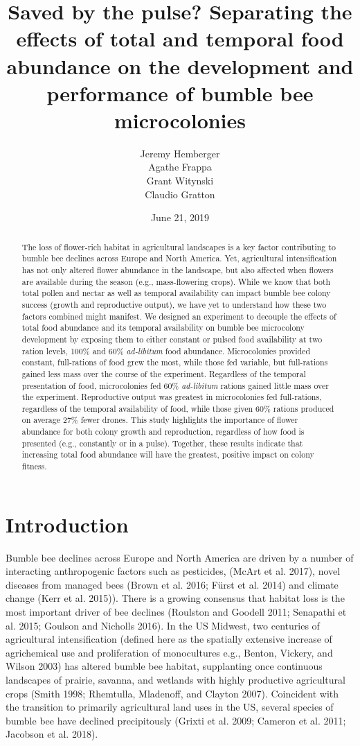 \documentclass[11pt,]{article}
\title{Saved by the pulse? Separating the effects of total and temporal food
abundance on the development and performance of bumble bee microcolonies}
\author{Jeremy Hemberger \\ Agathe Frappa \\ Grant Witynski \\ Claudio Gratton}
\date{June 21, 2019}
\begin{document}
\maketitle
\begin{abstract}
The loss of flower-rich habitat in agricultural landscapes is a key
factor contributing to bumble bee declines across Europe and North
America. Yet, agricultural intensification has not only altered flower
abundance in the landscape, but also affected when flowers are available
during the season (e.g., mass-flowering crops). While we know that both
total pollen and nectar as well as temporal availability can impact
bumble bee colony success (growth and reproductive output), we have yet
to understand how these two factors combined might manifest. We designed
an experiment to decouple the effects of total food abundance and its
temporal availability on bumble bee microcolony development by exposing
them to either constant or pulsed food availability at two ration
levels, 100\% and 60\% \emph{ad-libitum} food abundance. Microcolonies
provided constant, full-rations of food grew the most, while those fed
variable, but full-rations gained less mass over the course of the
experiment. Regardless of the temporal presentation of food,
microcolonies fed 60\% \emph{ad-libitum} rations gained little mass over
the experiment. Reproductive output was greatest in microcolonies fed
full-rations, regardless of the temporal availability of food, while
those given 60\% rations produced on average 27\% fewer drones. This
study highlights the importance of flower abundance for both colony
growth and reproduction, regardless of how food is presented (e.g.,
constantly or in a pulse). Together, these results indicate that
increasing total food abundance will have the greatest, positive impact
on colony fitness.
\end{abstract}

\hypertarget{introduction}{%
\section{Introduction}\label{introduction}}

Bumble bee declines across Europe and North America are driven by a
number of interacting anthropogenic factors such as pesticides, (McArt
et al. 2017), novel diseases from managed bees (Brown et al. 2016; Fürst
et al. 2014) and climate change (Kerr et al. 2015)). There is a growing
consensus that habitat loss is the most important driver of bee declines
(Roulston and Goodell 2011; Senapathi et al. 2015; Goulson and Nicholls
2016). In the US Midwest, two centuries of agricultural intensification
(defined here as the spatially extensive increase of agrichemical use
and proliferation of monocultures e.g., Benton, Vickery, and Wilson
2003) has altered bumble bee habitat, supplanting once continuous
landscapes of prairie, savanna, and wetlands with highly productive
agricultural crops (Smith 1998; Rhemtulla, Mladenoff, and Clayton 2007).
Coincident with the transition to primarily agricultural land uses in
the US, several species of bumble bee have declined precipitously
(Grixti et al. 2009; Cameron et al. 2011; Jacobson et al. 2018).
\end{document}
